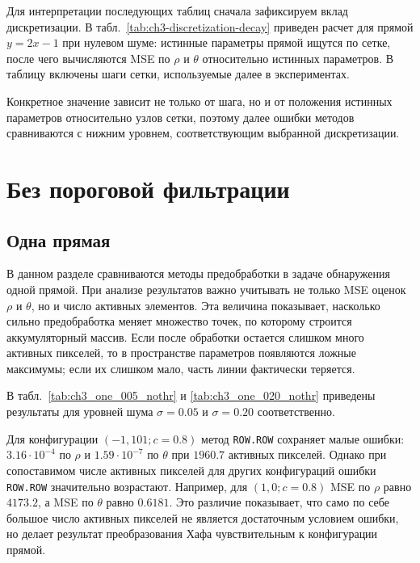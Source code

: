 Для интерпретации последующих таблиц сначала зафиксируем вклад дискретизации.
В табл.~\ref{tab:ch3-discretization-decay} приведен расчет для
прямой $y=2x-1$ при нулевом шуме: истинные параметры прямой ищутся по сетке,
после чего вычисляются MSE по $\rho$ и $\theta$ относительно истинных
параметров. В таблицу включены шаги сетки, используемые далее в
экспериментах.

\begin{table}[H]
	\centering
	\caption{Влияние шага сетки Хафа на нижний уровень ошибки для прямой
	$y=2x-1$}
	\label{tab:ch3-discretization-decay}
	\resizebox{0.55\textwidth}{!}{%
		
	}
\end{table}

Конкретное значение зависит не только от шага, но и от положения истинных параметров
относительно узлов сетки, поэтому далее ошибки методов сравниваются с нижним
уровнем, соответствующим выбранной дискретизации.

\section{Без пороговой фильтрации}

\subsection{Одна прямая}

В данном разделе сравниваются методы предобработки в задаче обнаружения одной
прямой. При анализе результатов важно учитывать не только MSE оценок $\rho$ и
$\theta$, но и число активных элементов. Эта величина показывает, насколько
сильно предобработка меняет множество точек, по которому строится
аккумуляторный массив. Если после обработки остается слишком много активных
пикселей, то в пространстве параметров появляются ложные максимумы; если их
слишком мало, часть линии фактически теряется.

В табл.~\ref{tab:ch3_one_005_nothr} и
\ref{tab:ch3_one_020_nothr} приведены результаты для уровней шума
$\sigma=0.05$ и $\sigma=0.20$ соответственно.





Для конфигурации
$(-1,101;c=0.8)$ метод \texttt{ROW.ROW} сохраняет малые ошибки:
$3.16\cdot 10^{-4}$ по $\rho$ и $1.59\cdot 10^{-7}$ по $\theta$ при
$1960.7$ активных пикселей. Однако при сопоставимом числе активных пикселей
для других конфигураций ошибки \texttt{ROW.ROW} значительно возрастают.
Например, для $(1,0;c=0.8)$ MSE по $\rho$ равно $4173.2$, а MSE по $\theta$
равно $0.6181$. Это различие показывает, что само по себе большое число
активных пикселей не является достаточным условием ошибки, но делает результат
преобразования Хафа чувствительным к конфигурации прямой.


